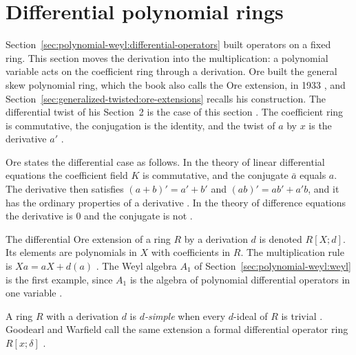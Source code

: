 \section{Differential polynomial rings}\label{sec:polynomial-weyl:ore-differential}

Section~\ref{sec:polynomial-weyl:differential-operators} built operators
on a fixed ring. This section moves the derivation into the multiplication:
a polynomial variable acts on the coefficient ring through a derivation.
Ore built the general skew polynomial ring, which the book also calls the Ore
extension, in 1933
\cite[p.~480]{Ore1933}, and
Section~\ref{sec:generalized-twisted:ore-extensions} recalls his
construction. The differential twist of his Section~2 is the case of this
section \cite[p.~482]{Ore1933}. %
The coefficient ring is commutative, the conjugation is the identity,
and the twist of $a$ by $x$ is the derivative $a'$
\cite[p.~482]{Ore1933}.

\begin{remark}\label{rem:pw:ore-differential}
Ore states the differential case as follows. In the theory of linear
differential equations the coefficient field $K$ is commutative, and the
conjugate $\bar{a}$ equals $a$. The derivative then satisfies
$(a+b)'=a'+b'$ and $(ab)'=ab'+a'b$, and it has the ordinary properties
of a derivative \cite[p.~482]{Ore1933}. %
In the theory of difference equations the derivative is
$0$ and the conjugate is not \cite[p.~482]{Ore1933}.
\end{remark}

The differential Ore extension of a ring $R$ by a derivation $d$ is
denoted $R[X;d]$. Its elements are polynomials in $X$ with coefficients
in $R$. The multiplication rule is $Xa=aX+d(a)$
\cite[p.~481, (3)]{Ore1933}. %
The Weyl algebra $A_{1}$ of Section~\ref{sec:polynomial-weyl:weyl} is the
first example, since $A_{1}$ is the algebra of polynomial differential
operators in one variable \cite[p.~1]{BelovKanelKontsevich2007}. %

A ring $R$ with a derivation $d$ is \emph{$d$-simple} when every
$d$-ideal of $R$ is trivial \cite[p.~801]{Lequain2008}. Goodearl and
Warfield call the same extension a formal differential operator ring
$R[x;\delta]$ \cite[p.~28]{GoodearlWarfield2004}. %

